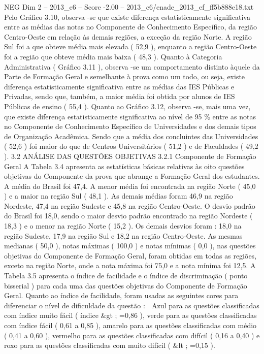 \begin{textsample}{NEG Dim 2 – 2013\_c6 – Score -2.00 – 2013\_c6/enade\_2013\_ef\_ff5b888e18.txt}
Pelo Gráfico 3.10, observa -se que existe diferença estatisticamente significativa entre as médias das notas no Componente de Conhecimento Específico, da região Centro-Oeste em relação às demais regiões, a exceção da região Norte.
A região Sul foi a que obteve média mais elevada ( 52,9 ), enquanto a região Centro-Oeste foi a região que obteve média mais baixa ( 48,3 ).
Quanto à Categoria Administrativa ( Gráfico 3.11 ), observa -se um comportamento distinto àquele da Parte de Formação Geral e semelhante à prova como um todo, ou seja, existe diferença estatisticamente significativa entre as médias das IES Públicas e Privadas, sendo que, também, a maior média foi obtida por alunos de IES Públicas de ensino ( 55,4 ).
Quanto ao Gráfico 3.12, observa -se, mais uma vez, que existe diferença estatisticamente significativa ao nível de 95 \% entre as notas no Componente de Conhecimento Específico de Universidades e dos demais tipos de Organização Acadêmica.
Sendo que a média dos concluintes das Universidades ( 52,6 ) foi maior do que de Centros Universitários ( 51,2 ) e de Faculdades ( 49,2 ). 3.2 ANÁLISE DAS QUESTÕES OBJETIVAS 3.2.1 Componente de Formação Geral A Tabela 3.4 apresenta as estatísticas básicas relativas às oito questões objetivas do Componente da prova que abrange a Formação Geral dos estudantes.
A média do Brasil foi 47,4.
A menor média foi encontrada na região Norte ( 45,0 ) e a maior na região Sul ( 48,1 ).
As demais médias foram 46,9 na região Nordeste, 47,4 na região Sudeste e 45,8 na região Centro-Oeste.
O desvio padrão do Brasil foi 18,0, sendo o maior desvio padrão encontrado na região Nordeste ( 18,3 ) e o menor na região Norte ( 15,2 ).
Os demais desvios foram : 18,0 na região Sudeste, 17,9 na região Sul e 18,2 na região Centro-Oeste.
As mesmas medianas ( 50,0 ), notas máximas ( 100,0 ) e notas mínimas ( 0,0 ), nas questões objetivas do Componente de Formação Geral, foram obtidas em todas as regiões, exceto na região Norte, onde a nota máxima foi 75,0 e a nota mínima foi 12,5.
A Tabela 3.5 apresenta o índice de facilidade e o índice de discriminação ( ponto bisserial ) para cada uma das questões objetivas do Componente de Formação Geral.
Quanto ao índice de facilidade, foram usadas as seguintes cores para diferenciar o nível de dificuldade da questão :  Azul para as questões classificadas com índice muito fácil ( índice \&gt ; =0,86 ), verde para as questões classificadas com índice fácil ( 0,61 a 0,85 ), amarelo para as questões classificadas com médio ( 0,41 a 0,60 ), vermelho para as questões classificadas com difícil ( 0,16 a 0,40 ) e roxo para as questões classificadas com muito difícil ( \&lt ; =0,15 ).

\end{textsample}
